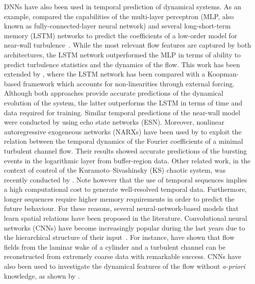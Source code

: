 DNNs have also been used in temporal prediction of dynamical systems.
As an example, \citet{srinivasan2019predictions} compared the capabilities of the multi-layer perceptron (MLP, also known as fully-connected-layer neural network) and several long-short-term memory (LSTM) networks to predict the coefficients of a low-order model for near-wall turbulence~\citep{moehlis2004low}.
While the most relevant flow features are captured by both architectures, the LSTM network outperformed the MLP in terms of ability to predict turbulence statistics and the dynamics of the flow.
This work has been extended by \citet{eivazi2020recurrent}, where the LSTM network has been compared with a Koopman-based framework which accounts for non-linearities through external forcing.
Although both approaches provide accurate predictions of the dynamical evolution of the system, the latter outperforms the LSTM in terms of time and data required for training.
Similar temporal predictions of the near-wall model~\citep{moehlis2004low} were conducted by \cite{pandey2020perspective} using echo state networks (ESN).
Moreover, nonlinear autoregressive exogeneous networks (NARXs) have been used by \citet{lozano2020causality} to exploit the relation between the temporal dynamics of the Fourier coefficients of a minimal turbulent channel flow.
Their results showed accurate predictions of the bursting events in the logarithmic layer from buffer-region data.
Other related work, in the context of control of the Kuramoto--Sivashinsky (KS) chaotic system, was recently conducted by \cite{bucci2019control}.
Note however that the use of temporal sequences implies a high computational cost to generate well-resolved temporal data.
Furthermore, longer sequences require higher memory requirements in order to predict the future behaviour.
For these reasons, several neural-network-based models that learn spatial relations have been proposed in the literature.
Convolutional neural networks (CNNs) have become increasingly popular during the last years due to the hierarchical structure of their input~\citep{fukushima1980neocognitron,fukushima1988neocognitron, lecun1989backpropagation,lecun1998gradient}.
For instance, \citet{fukami2019super,fukami2021machine} have shown that flow fields from the laminar wake of a cylinder and a turbulent channel can be reconstructed from extremely coarse data with remarkable success.
CNNs have also been used to investigate the dynamical features of the flow without \textit{a-priori} knowledge, as shown by \citet{jagodinski2020uncovering}.

